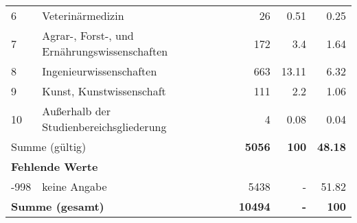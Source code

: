 \begin{longtable}{lXrrr}
     6 &
     \multicolumn{1}{X}{ Veterinärmedizin   } &


       \num{26} &
       \num[round-mode=places,round-precision=2]{0.51} &
         \num[round-mode=places,round-precision=2]{0.25} \\

     7 &
     \multicolumn{1}{X}{ Agrar-, Forst-, und Ernährungswissenschaften   } &


       \num{172} &
       \num[round-mode=places,round-precision=2]{3.4} &
         \num[round-mode=places,round-precision=2]{1.64} \\

     8 &
     \multicolumn{1}{X}{ Ingenieurwissenschaften   } &


       \num{663} &
       \num[round-mode=places,round-precision=2]{13.11} &
         \num[round-mode=places,round-precision=2]{6.32} \\

     9 &
     \multicolumn{1}{X}{ Kunst, Kunstwissenschaft   } &


       \num{111} &
       \num[round-mode=places,round-precision=2]{2.2} &
         \num[round-mode=places,round-precision=2]{1.06} \\

     10 &
     \multicolumn{1}{X}{ Außerhalb der Studienbereichsgliederung   } &


       \num{4} &
       \num[round-mode=places,round-precision=2]{0.08} &
         \num[round-mode=places,round-precision=2]{0.04} \\
     \midrule
     \multicolumn{2}{l}{Summe (gültig)} &
       \textbf{\num{5056}} &
     \textbf{\num{100}} &
       \textbf{\num[round-mode=places,round-precision=2]{48.18}} \\
     \multicolumn{5}{l}{\textbf{Fehlende Werte}}\\
       -998 &
       keine Angabe &
         \num{5438} &
        - &
         \num[round-mode=places,round-precision=2]{51.82} \\
     \midrule
     \multicolumn{2}{l}{\textbf{Summe (gesamt)}} &
          \textbf{\num{10494}} &
        \textbf{-} &
        \textbf{\num{100}} \\
     \bottomrule
     \end{longtable}
     
